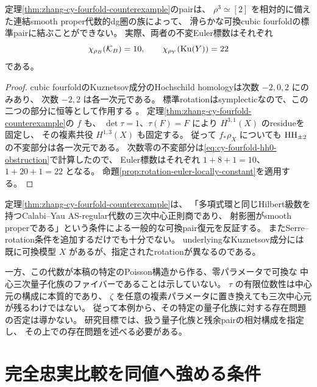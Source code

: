 \begin{corollary}
\label{cor:zhang-cy-component-obstruction}
 定理\ref{thm:zhang-cy-fourfold-counterexample}のpairは、
 \(\rho^3\simeq[2]\) を相対的に備えた連結smooth proper代数的dg圏の族によって、
 滑らかな可換cubic fourfoldの標準pairに結ぶことができない。
 実際、両者の不変Euler標数はそれぞれ
 \[
 \chi_{\rho_B}(\mathcal K_B)=10,
 \qquad
 \chi_{\rho_Y}(\operatorname{Ku}(Y))=22
 \]
 である。
\end{corollary}
\begin{proof}
 cubic fourfoldのKuznetsov成分のHochschild homologyは次数 \(-2,0,2\) にのみあり、
 次数 \(-2,2\) は各一次元である。
 標準rotationはsymplecticなので、この二つの部分に恒等として作用する
 \cite[Proposition 3.12]{Huy}。
 定理\ref{thm:zhang-cy-fourfold-counterexample}の \(f\) も、
 \(\det\tau=1\)、\(\tau(F)=F\) により \(H^{3,1}(X)\) のresidueを固定し、
 その複素共役 \(H^{1,3}(X)\) も固定する。
 従って \(f_*\rho_X\) についても \(\operatorname{HH}_{\pm2}\) の不変部分は各一次元である。
 次数零の不変部分は\eqref{eq:cy-fourfold-hh0-obstruction}で計算したので、
 Euler標数はそれぞれ \(1+8+1=10\)、\(1+20+1=22\) となる。
 命題\ref{prop:rotation-euler-locally-constant}を適用する。
\end{proof}

\begin{remark}[量子化族との論理的関係]
\label{rem:counterexample-quantization-scope}
 定理\ref{thm:zhang-cy-fourfold-counterexample}は、
 「多項式環と同じHilbert級数を持つCalabi--Yau AS-regular代数の三次中心正則商であり、
 射影圏がsmooth properである」という条件による一般的な可換pair復元を反証する。
 またSerre--rotation条件を追加するだけでも十分でない。
 underlyingなKuznetsov成分には既に可換模型 \(X\) があるが、指定されたrotationが異なるのである。

 一方、この代数が本稿の特定のPoisson構造から作る、零パラメータで可換な
 中心三次量子化族のファイバーであることは示していない。
 \(\tau\) の有限位数性は中心元の構成に本質的であり、
 \(\zeta\) を任意の複素パラメータに置き換えても三次中心元が残るわけではない。
 従って本例から、その特定の量子化族に対する存在問題の否定は導かない。
 研究目標では、扱う量子化族と残余pairの相対構成を指定し、
 その上での存在問題を述べる必要がある。
\end{remark}

\section{完全忠実比較を同値へ強める条件}
\label{sec:serre-generation}

